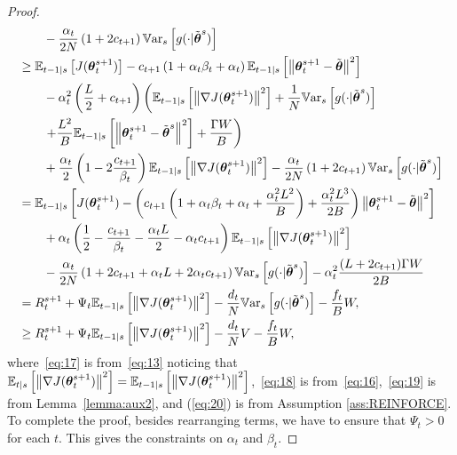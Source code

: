 \begin{proof}
\begin{align}
	&\qquad-\frac{\alpha_t}{2N}\left(1+2c_{t+1}\right)\Vars{g(\cdot\vert\tilde{\vtheta}^s)} \nonumber\\
	&\geq  \Ets[t-1]{J(\vtheta_t^{s+1})} - c_{t+1}\left(1+\alpha_t\beta_t+\alpha_t\right)\Ets[t-1]{\norm[]{\vtheta_{t}^{s+1}-\tilde{\vtheta}}^2} \nonumber\\
	&\qquad
	-\alpha_t^2\left(\frac{L}{2}+c_{t+1}\right)\left(\Ets[t-1]{\norm[]{\gradJ{\vtheta_t^{s+1}}}^2} 
	+\frac{1}{N}\Vars{g(\cdot\vert\tilde{\vtheta}^s)}
	\right.\nonumber\\
	&\left.\qquad+\frac{L^2}{B}\Ets[t-1]{\norm[]{\vtheta_t^{s+1}-\tilde{\vtheta}^s}^2}
	+\frac{\Gamma W}{B}\right)\nonumber\\
	&\qquad+\frac{\alpha_t}{2}\left(1-2\frac{c_{t+1}}{\beta_t}\right)\Ets[t-1]{\norm[]{\gradJ{\vtheta_t^{s+1}}}^2} -\frac{\alpha_t}{2N}\left(1+2c_{t+1}\right)\Vars{g(\cdot\vert\tilde{\vtheta}^s)} \label{eq:19}\\
	& = \Ets[t-1]{J(\vtheta_t^{s+1}) - \left(c_{t+1}\left(1+\alpha_t\beta_t+\alpha_t+\frac{\alpha_t^2L^2}{B}\right)+\frac{\alpha_t^2L^3}{2B}\right)\norm[]{\vtheta_{t}^{s+1}-\tilde{\vtheta}}^2} \nonumber\\
	&\qquad
	+\alpha_t\left(\frac{1}{2}-\frac{c_{t+1}}{\beta_t}-\frac{\alpha_tL}{2}-\alpha_tc_{t+1}\right)\Ets[t-1]{\norm[]{\gradJ{\vtheta_t^{s+1}}}^2} \nonumber\\
	&\qquad-\frac{\alpha_t}{2N}\left(1+2c_{t+1}+\alpha_tL+2\alpha_tc_{t+1}\right)\Vars{g(\cdot\vert\tilde{\vtheta}^s)} 
	-\alpha_t^2\frac{(L+2c_{t+1})\Gamma\VARIS}{2B} \nonumber\\
	&= R_t^{s+1}
	+\Psi_t\Ets[t-1]{\norm[]{\gradJ{\vtheta_t^{s+1}}}^2}
	-\frac{d_t}{N}\Vars{g(\cdot\vert\tilde{\vtheta}^s)}
	-\frac{f_t}{B}\VARIS,\nonumber\\
	&\geq R_t^{s+1}
	+\Psi_t\Ets[t-1]{\norm[]{\gradJ{\vtheta_t^{s+1}}}^2}
	-\frac{d_t}{N}\VARRF
	-\frac{f_t}{B}\VARIS, \label{eq:20}
	\end{align}
	\endgroup
	where~\eqref{eq:17} is from~\eqref{eq:13} noticing that \newline $\EVV[t|s]{\norm[]{\nabla J(\vtheta^{s+1}_t)}^2} = \EVV[t-1|s]{\norm[]{\nabla J(\vtheta^{s+1}_t)}^2}$,~\eqref{eq:18} is from~\eqref{eq:16},~\eqref{eq:19} is from Lemma~\ref{lemma:aux2}, and (\ref{eq:20}) is from Assumption \ref{ass:REINFORCE}.
	To complete the proof, besides rearranging terms, we have to ensure that $\Psi_t>0$ for each $t$. This gives the constraints on $\alpha_t$ and $\beta_t$.
\end{proof}


